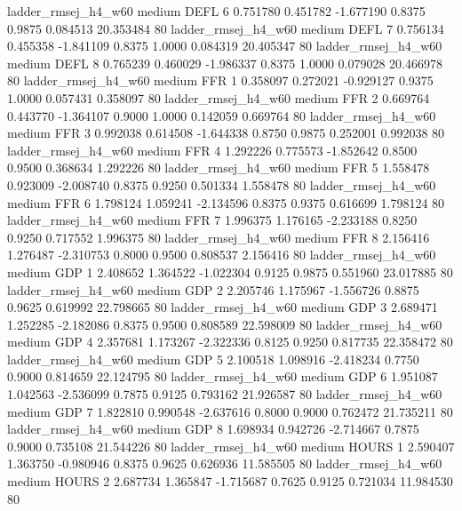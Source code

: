   ladder_rmsej_h4_w60     medium     DEFL                 6  0.751780 0.451782 -1.677190 0.8375 0.9875  0.084513   20.353484 80
   ladder_rmsej_h4_w60     medium     DEFL                 7  0.756134 0.455358 -1.841109 0.8375 1.0000  0.084319   20.405347 80
   ladder_rmsej_h4_w60     medium     DEFL                 8  0.765239 0.460029 -1.986337 0.8375 1.0000  0.079028   20.466978 80
   ladder_rmsej_h4_w60     medium      FFR                 1  0.358097 0.272021 -0.929127 0.9375 1.0000  0.057431    0.358097 80
   ladder_rmsej_h4_w60     medium      FFR                 2  0.669764 0.443770 -1.364107 0.9000 1.0000  0.142059    0.669764 80
   ladder_rmsej_h4_w60     medium      FFR                 3  0.992038 0.614508 -1.644338 0.8750 0.9875  0.252001    0.992038 80
   ladder_rmsej_h4_w60     medium      FFR                 4  1.292226 0.775573 -1.852642 0.8500 0.9500  0.368634    1.292226 80
   ladder_rmsej_h4_w60     medium      FFR                 5  1.558478 0.923009 -2.008740 0.8375 0.9250  0.501334    1.558478 80
   ladder_rmsej_h4_w60     medium      FFR                 6  1.798124 1.059241 -2.134596 0.8375 0.9375  0.616699    1.798124 80
   ladder_rmsej_h4_w60     medium      FFR                 7  1.996375 1.176165 -2.233188 0.8250 0.9250  0.717552    1.996375 80
   ladder_rmsej_h4_w60     medium      FFR                 8  2.156416 1.276487 -2.310753 0.8000 0.9500  0.808537    2.156416 80
   ladder_rmsej_h4_w60     medium      GDP                 1  2.408652 1.364522 -1.022304 0.9125 0.9875  0.551960   23.017885 80
   ladder_rmsej_h4_w60     medium      GDP                 2  2.205746 1.175967 -1.556726 0.8875 0.9625  0.619992   22.798665 80
   ladder_rmsej_h4_w60     medium      GDP                 3  2.689471 1.252285 -2.182086 0.8375 0.9500  0.808589   22.598009 80
   ladder_rmsej_h4_w60     medium      GDP                 4  2.357681 1.173267 -2.322336 0.8125 0.9250  0.817735   22.358472 80
   ladder_rmsej_h4_w60     medium      GDP                 5  2.100518 1.098916 -2.418234 0.7750 0.9000  0.814659   22.124795 80
   ladder_rmsej_h4_w60     medium      GDP                 6  1.951087 1.042563 -2.536099 0.7875 0.9125  0.793162   21.926587 80
   ladder_rmsej_h4_w60     medium      GDP                 7  1.822810 0.990548 -2.637616 0.8000 0.9000  0.762472   21.735211 80
   ladder_rmsej_h4_w60     medium      GDP                 8  1.698934 0.942726 -2.714667 0.7875 0.9000  0.735108   21.544226 80
   ladder_rmsej_h4_w60     medium    HOURS                 1  2.590407 1.363750 -0.980946 0.8375 0.9625  0.626936   11.585505 80
   ladder_rmsej_h4_w60     medium    HOURS                 2  2.687734 1.365847 -1.715687 0.7625 0.9125  0.721034   11.984530 80
